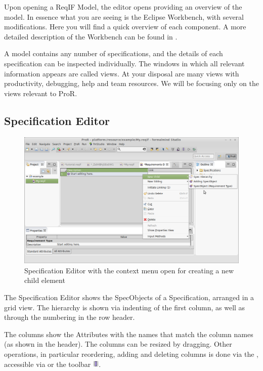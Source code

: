 Upon opening a ReqIF Model, the editor opens providing an overview of the model.  In essence what you are seeing is the Eclipse Workbench, with several modifications.  Here you will find a quick overview of each component.  A more detailed description of the Workbench can be found in 
.

A model contains any number of specifications, and the details of each specification can be inspected individually.  The windows in which all relevant information appears are called views.  At your disposal are many views with productivity, debugging, help and team resources.  We will be focusing only on the views relevant to ProR.

\subsection{Specification Editor}

\begin{figure}
  \centering
  \includegraphics[width=\linewidth]{../rmf-images/default_spec_view.png}
  \caption{Specification Editor with the context menu open for creating a new child element}
  \label{fig:default specification editor}
\end{figure}

The Specification Editor shows the SpecObjects of a Specification, arranged in a grid view.  The hierarchy is shown via indenting of the first column, as well as through the numbering in the row header.

The columns show the Attributes with the names that match the column names (as shown in the header).  The columns can be resized by dragging.  Other operations, in particular reordering, adding and deleting columns is done via the , accessible via  or the toolbar \includegraphics[height=0.8em]{../rmf-images/icons/full/obj16/Column.png}. 

